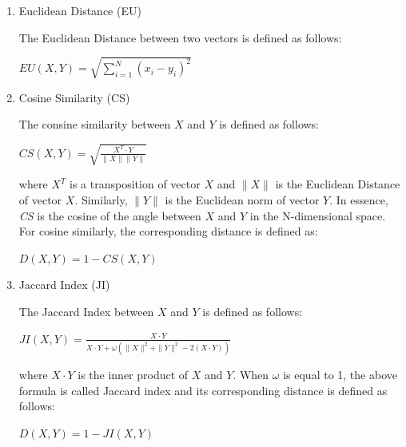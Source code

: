 \begin{enumerate}
\item Euclidean Distance (EU)

The Euclidean Distance between two vectors is defined as follows:
\begin{center}
$EU(\mathit{X}, \mathit{Y}) = \displaystyle \sqrt{\sum_{i=1}^{N} (x_i-y_i)^2}$
\end{center}

\item Cosine Similarity (CS)

The consine similarity between $\mathit{X}$ and $\mathit{Y}$ is defined as follows:

\begin{center}
$CS(\mathit{X}, \mathit{Y}) = \displaystyle \sqrt{\frac{\mathit{X}^T \cdot \mathit{Y}} {\| \mathit{X} \|\| \mathit{Y} \|}}$
\end{center}
where $\mathit{X}^T$ is a transposition of vector $\mathit{X}$ and $\| \mathit{X}\|$ is the Euclidean Distance of
vector $\mathit{X}$. Similarly, $\|\mathit{Y}\|$ is the Euclidean norm of vector $\mathit{Y}$. In essence, \textit{CS} is the cosine of the angle between $\mathit{X}$ and $\mathit{Y}$ in the N-dimensional space. For cosine similarly, the corresponding distance is defined as:

\begin{center}
$D(\mathit{X},\mathit{Y}) = 1 - CS(\mathit{X},\mathit{Y})$
\end{center}

\item Jaccard Index (JI)

The Jaccard Index between $\mathit{X}$ and $\mathit{Y}$ is defined as follows:

\begin{center}
$JI(\mathit{X}, \mathit{Y}) = \displaystyle \frac{\mathit{X} \cdot \mathit{Y}}{\mathit{X} \cdot \mathit{Y}+\omega(\|\mathit{X}\|^2+\|\mathit{Y}\|^2-2(\mathit{X} \cdot \mathit{Y}))}$
\end{center}

where $\mathit{X} \cdot \mathit{Y}$ is the inner product of $\mathit{X}$ and $\mathit{Y}$. 
When $\omega$ is equal to 1, the above formula is called Jaccard index and its corresponding distance is defined as follows:

\begin{center}
$D(\mathit{X},\mathit{Y}) = 1 - JI(\mathit{X},\mathit{Y})$
\end{center}

\end{enumerate}

